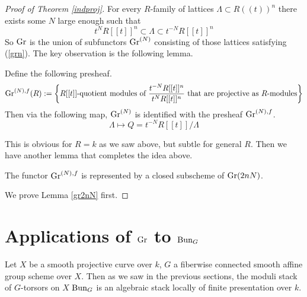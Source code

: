 \documentclass[12pt]{article}
\begin{document}
\begin{proof}[Proof of Theorem \ref{indproj}]
    For every $R$-family of lattices $\Lambda \subset R((t))^n$ there exists some $N$ large enough such that
    \begin{equation}\label{grn}
        t^N R[[t]]^n \subset \Lambda \subset t^{-N} R[[t]]^n
    \end{equation}
    So $\operatorname{Gr}$ is the union of subfunctors $\operatorname{Gr}^{(N)}$ consisting of those lattices satisfying (\ref{grn}). The key observation is the following lemma.
    \begin{lem}\label{grNf}
        Define the following presheaf.
        \[\operatorname{Gr}^{(N), f}(R) := \left\{R[[t]]\text{-quotient modules of } \frac{t^{-N} R[[t]]^n}{t^N R[[t]]^n} \text{ that are projective as }R\text{-modules}\right\}\]
        Then via the following map, $\operatorname{Gr}^{(N)}$ is identified with the presheaf $\operatorname{Gr}^{(N),f}$.
        \[\Lambda \mapsto Q = t^{-N} R[[t]]/\Lambda \]
    \end{lem}
    This is obvious for $R = k$ as we saw above, but subtle for general $R$. Then we have another lemma that completes the idea above.
    \begin{lem}\label{gr2nN}
        The functor $\operatorname{Gr}^{(N), f}$ is represented by a closed subscheme of $\operatorname{Gr}(2nN)$.
    \end{lem}
    We prove Lemma \ref{gr2nN} first.
    
\end{proof}

\section{Applications of $\operatorname{Gr}$ to $\operatorname{Bun}_G$}

Let $X$ be a smooth projective curve over $k$, $G$ a fiberwise connected smooth affine group scheme over $X$. Then as we saw in the previous sections, the moduli stack of $G$-torsors on $X$ $\operatorname{Bun}_G$ is an algebraic stack locally of finite presentation over $k$. 
\end{document}
